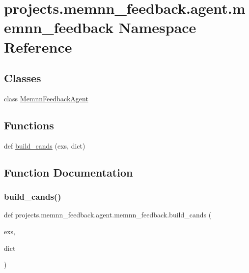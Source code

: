 \hypertarget{namespaceprojects_1_1memnn__feedback_1_1agent_1_1memnn__feedback}{}\section{projects.\+memnn\+\_\+feedback.\+agent.\+memnn\+\_\+feedback Namespace Reference}
\label{namespaceprojects_1_1memnn__feedback_1_1agent_1_1memnn__feedback}
\subsection*{Classes}
\begin{DoxyCompactItemize}
\item 
class \hyperlink{classprojects_1_1memnn__feedback_1_1agent_1_1memnn__feedback_1_1MemnnFeedbackAgent}{Memnn\+Feedback\+Agent}
\end{DoxyCompactItemize}
\subsection*{Functions}
\begin{DoxyCompactItemize}
\item 
def \hyperlink{namespaceprojects_1_1memnn__feedback_1_1agent_1_1memnn__feedback_a098f9dace138acef711a30ce16831284}{build\+\_\+cands} (exs, dict)
\end{DoxyCompactItemize}


\subsection{Function Documentation}
\mbox{\label{namespaceprojects_1_1memnn__feedback_1_1agent_1_1memnn__feedback_a098f9dace138acef711a30ce16831284}} 
\subsubsection{\texorpdfstring{build\+\_\+cands()}{build\_cands()}}
{\footnotesize\ttfamily def projects.\+memnn\+\_\+feedback.\+agent.\+memnn\+\_\+feedback.\+build\+\_\+cands (\begin{DoxyParamCaption}\item[{}]{exs,  }\item[{}]{dict }\end{DoxyParamCaption})}



